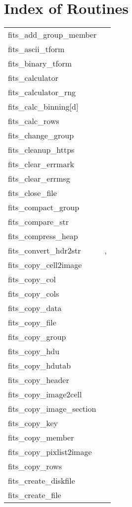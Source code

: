 \documentclass[11pt]{book}
\begin{document}
\chapter{Index of Routines }
\begin{tabular}{lr}
fits\_add\_group\_member & \pageref{ffgtam} \\
fits\_ascii\_tform    & \pageref{ffasfm} \\
fits\_binary\_tform   & \pageref{ffbnfm} \\
fits\_calculator     & \pageref{ffcalc} \\
fits\_calculator\_rng     & \pageref{ffcalcrng} \\
fits\_calc\_binning[d] & \pageref{calcbinning} \\
fits\_calc\_rows    & \pageref{ffcrow} \\
fits\_change\_group  & \pageref{ffgtch} \\
fits\_cleanup\_https & \pageref{ffihtps} \\
fits\_clear\_errmark  & \pageref{ffpmrk} \\
fits\_clear\_errmsg   & \pageref{ffcmsg} \\
fits\_close\_file     & \pageref{ffclos} \\
fits\_compact\_group & \pageref{ffgtcm} \\
fits\_compare\_str    & \pageref{ffcmps} \\
fits\_compress\_heap & \pageref{ffcmph} \\
fits\_convert\_hdr2str  & \pageref{ffhdr2str}, \pageref{hdr2str} \\
fits\_copy\_cell2image & \pageref{copycell} \\
fits\_copy\_col     & \pageref{ffcpcl} \\
fits\_copy\_cols    & \pageref{ffccls} \\
fits\_copy\_data      & \pageref{ffcpdt} \\
fits\_copy\_file      & \pageref{ffcpfl} \\
fits\_copy\_group    & \pageref{ffgtcp} \\
fits\_copy\_hdu       & \pageref{ffcopy} \\
fits\_copy\_hdutab    & \pageref{ffcpht} \\
fits\_copy\_header    & \pageref{ffcphd} \\
fits\_copy\_image2cell & \pageref{copycell} \\
fits\_copy\_image\_section  & \pageref{ffcpimg} \\
fits\_copy\_key           & \pageref{ffcpky} \\
fits\_copy\_member    & \pageref{ffgmcp} \\
fits\_copy\_pixlist2image & \pageref{copypixlist2image} \\
fits\_copy\_rows &   \pageref{ffcprw} \\
fits\_create\_diskfile    & \pageref{ffinit} \\
fits\_create\_file    & \pageref{ffinit} \\

\end{tabular}
\end{document}
